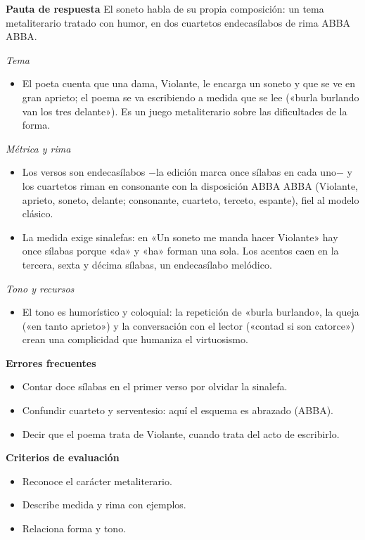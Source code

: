\documentclass{book}
\begin{document}
\begin{tcolorbox}[title={Ejercicio resuelto}, studiumworked, breakable]
\noindent\textbf{Pauta de respuesta}
El soneto habla de su propia composición: un tema metaliterario tratado con humor, en dos cuartetos endecasílabos de rima ABBA ABBA.


\noindent\textit{Tema}
\begin{itemize}
\item El poeta cuenta que una dama, Violante, le encarga un soneto y que se ve en gran aprieto; el poema se va escribiendo a medida que se lee («burla burlando van los tres delante»). Es un juego metaliterario sobre las dificultades de la forma.
\end{itemize}

\noindent\textit{Métrica y rima}
\begin{itemize}
\item Los versos son endecasílabos \(-\)la edición marca once sílabas en cada uno\(-\) y los cuartetos riman en consonante con la disposición ABBA ABBA (Violante, aprieto, soneto, delante; consonante, cuarteto, terceto, espante), fiel al modelo clásico.
\item La medida exige sinalefas: en «Un soneto me manda hacer Violante» hay once sílabas porque «da» y «ha» forman una sola. Los acentos caen en la tercera, sexta y décima sílabas, un endecasílabo melódico.
\end{itemize}

\noindent\textit{Tono y recursos}
\begin{itemize}
\item El tono es humorístico y coloquial: la repetición de «burla burlando», la queja («en tanto aprieto») y la conversación con el lector («contad si son catorce») crean una complicidad que humaniza el virtuosismo.
\end{itemize}

\noindent\textbf{Errores frecuentes}
\begin{itemize}
\item Contar doce sílabas en el primer verso por olvidar la sinalefa.
\item Confundir cuarteto y serventesio: aquí el esquema es abrazado (ABBA).
\item Decir que el poema trata de Violante, cuando trata del acto de escribirlo.
\end{itemize}

\noindent\textbf{Criterios de evaluación}
\begin{itemize}
\item Reconoce el carácter metaliterario.
\item Describe medida y rima con ejemplos.
\item Relaciona forma y tono.
\end{itemize}
\end{tcolorbox}
\end{document}
